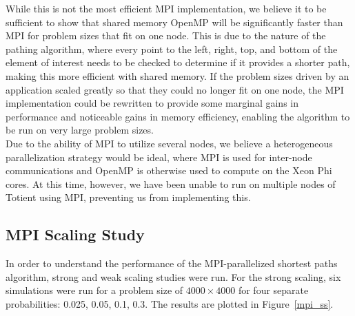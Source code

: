 \documentclass[11pt]{article}
\begin{document}
\noindent While this is not the most efficient MPI implementation, we believe it to be sufficient to show that shared memory OpenMP will be significantly faster than MPI for problem sizes that fit on one node. This is due to the nature of the pathing algorithm, where every point to the left, right, top, and bottom of the element of interest needs to be checked to determine if it provides a shorter path, making this more efficient with shared memory. If the problem sizes driven by an application scaled greatly so that they could no longer fit on one node, the MPI implementation could be rewritten to provide some marginal gains in performance and noticeable gains in memory efficiency, enabling the algorithm to be run on very large problem sizes. \\

\noindent Due to the ability of MPI to utilize several nodes, we believe a heterogeneous parallelization strategy would be ideal, where MPI is used for inter-node communications and OpenMP is otherwise used to compute on the Xeon Phi cores. At this time, however, we have been unable to run on multiple nodes of Totient using MPI, preventing us from implementing this.

\subsection{MPI Scaling Study}
In order to understand the performance of the MPI-parallelized shortest paths algorithm, strong and weak scaling studies were run. For the strong scaling, six simulations were run for a problem size of $4000 \times 4000$ for four separate probabilities: 0.025, 0.05, 0.1, 0.3. The results are plotted in Figure~\ref{mpi_ss}.
\end{document}

